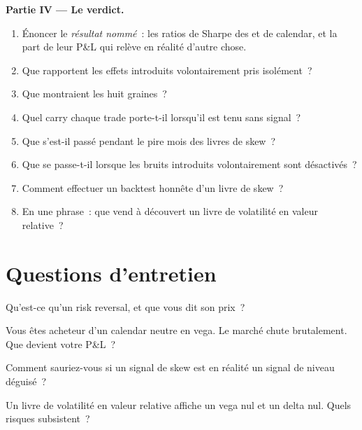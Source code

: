 \begin{problem}
\medskip\noindent\textbf{Partie IV --- Le verdict.}
\begin{enumerate}[resume]
\item Énoncer le \emph{résultat nommé}~: les ratios de Sharpe des  et de calendar, et la part de leur P\&L qui relève en réalité d'autre chose.
\item Que rapportent les effets introduits volontairement pris isolément~?
\item Que montraient les huit graines~?
\item Quel carry chaque trade porte-t-il lorsqu'il est tenu sans signal~?
\item Que s'est-il passé pendant le pire mois des livres de skew~?
\item Que se passe-t-il lorsque les bruits introduits volontairement sont désactivés~?
\item Comment effectuer un backtest honnête d'un livre de skew~?
\item En une phrase~: que vend à découvert un livre de volatilité en valeur relative~?
\end{enumerate}
\end{problem}

\section{Questions d'entretien}

\begin{interviewq}\label{iq:s2:skew-and-term-structure-relative-value:1}
Qu'est-ce qu'un risk reversal, et que vous dit son prix~?
\end{interviewq}

\begin{interviewq}\label{iq:s2:skew-and-term-structure-relative-value:2}
Vous êtes acheteur d'un calendar neutre en vega. Le marché chute brutalement. Que devient votre P\&L~?
\end{interviewq}

\begin{interviewq}\label{iq:s2:skew-and-term-structure-relative-value:3}
Comment sauriez-vous si un signal de skew est en réalité un signal de niveau déguisé~?
\end{interviewq}

\begin{interviewq}\label{iq:s2:skew-and-term-structure-relative-value:4}
Un livre de volatilité en valeur relative affiche un vega nul et un delta nul. Quels risques subsistent~?
\end{interviewq}

